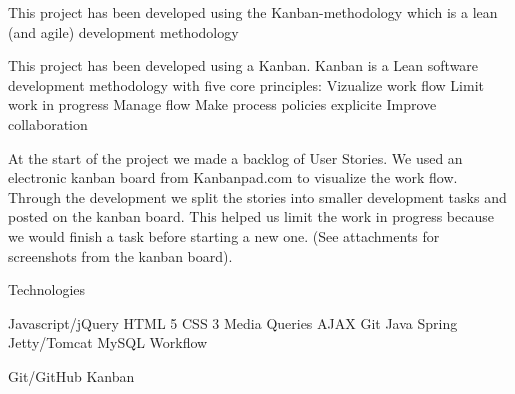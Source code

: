 This project has been developed using the Kanban-methodology which is a lean (and agile) development methodology


This project has been developed using a Kanban. Kanban is a Lean software development methodology with five core principles:
Vizualize work flow 
Limit work in progress 
Manage flow
Make process policies explicite
Improve collaboration

At the start of the project we made a backlog of User Stories. We used an electronic kanban board from Kanbanpad.com to visualize the work flow. Through the development we split the stories into smaller development tasks and posted on the kanban board. This helped us limit the work in progress because we would finish a task before starting a new one. (See attachments for screenshots from the kanban board). 

Technologies

Javascript/jQuery
HTML 5
CSS 3
Media Queries
AJAX
Git
Java
Spring
Jetty/Tomcat
MySQL
Workflow

Git/GitHub
Kanban